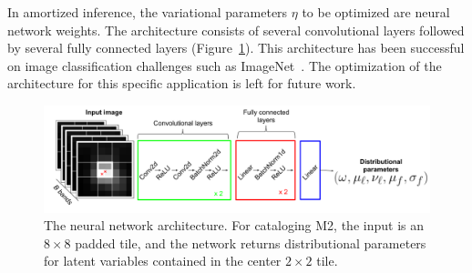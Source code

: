 In amortized inference, the variational parameters $\eta$ to be optimized are neural network weights.
The architecture consists of several convolutional layers followed by several fully connected layers (Figure~\ref{fig:starnet_arch}). 
This architecture has been successful on image classification challenges such as ImageNet~\citep{imagenet2015}. 
The optimization of the architecture for this specific application is left for future work. 



\begin{figure}[!tb]
    \centering
    \includegraphics[width=\textwidth]{figures/vi_figures/starnet_archetecture4.png}
    \vspace{-1.25cm}
    \caption{The neural network architecture. For cataloging M2, the input is an $8\times 8$ padded tile, and the network returns distributional parameters for latent variables contained in the center $2\times 2$ tile.
    }
    \label{fig:starnet_arch}
\end{figure}


